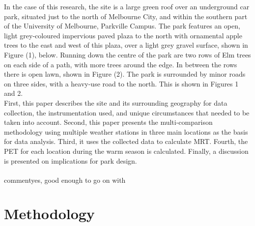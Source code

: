 \documentclass[twocolumn, a4paper]{article}
\providecommand{\comment}[1]{{\large\bf #1}}
\begin{document}
In the case of this research, the site is a large green roof over an underground car park, situated just to the north of Melbourne City, and within the southern part of the University of Melbourne, Parkville Campus. The park features an open, light grey-coloured impervious paved plaza to the north with ornamental apple trees to the east and west of this plaza, over a light grey gravel surface, shown in Figure (1), below. Running down the centre of the park are two rows of Elm trees on each side of a path, with more trees around the edge. In between the rows there is open lawn, shown in Figure (2). The park is surrounded by minor roads on three sides, with a heavy-use road to the north. This is shown in Figures 1 and 2.
\\

First, this paper describes the site and its surrounding geography for data collection, the instrumentation used, and unique circumstances that needed to be taken into account.
Second, this paper presents the multi-comparison methodology using multiple weather stations in three main locations as the basis for data analysis. Third, it uses the collected data to calculate MRT. Fourth, the PET for each location during the warm season is calculated. Finally, a discussion is presented on implications for park design.
\\
\\comment{yes, good enough to go on with}

\section{Methodology}
\end{document}
